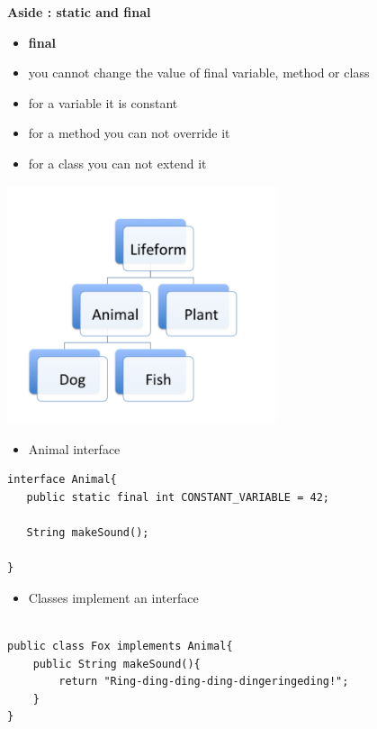 \documentclass{beamer}
\begin{document}
\begin{frame}
\begin{center}
\textbf{Aside : static and final}
\end{center}
\begin{itemize}
\item \textbf{final}
\bigskip 
\item you cannot change the value of  final variable, method or class
\item for a variable it is constant
\item for a method you can not override it
\item for a class you can not extend it
\end{itemize}
\end{frame}

\begin{frame}
\begin{center}
\includegraphics[height=7cm, keepaspectratio]{images/inheritance5}
\end{center}
\end{frame}

\begin{frame}[fragile]
\begin{itemize}
\item Animal interface
\end{itemize}
\begin{block}{}
\begin{lstlisting}
interface Animal{
   public static final int CONSTANT_VARIABLE = 42;
   
   String makeSound();

}
\end{lstlisting}
\end{block}
\end{frame}

\begin{frame}[fragile]
\begin{itemize}
\item Classes implement an interface 
\end{itemize}
\begin{block}{}
\begin{lstlisting}

public class Fox implements Animal{
    public String makeSound(){
    	return "Ring-ding-ding-ding-dingeringeding!";
    }
}
\end{lstlisting}
\end{block}
\end{frame}
\end{document}
